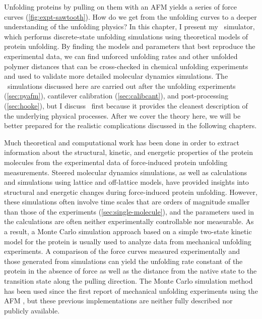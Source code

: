 Unfolding proteins by pulling on them with an AFM yields a series of
force curves (\cref{fig:expt-sawtooth}).  How do we get from the
unfolding curves to a deeper understanding of the unfolding physics?
In this chapter, I present my \sawsim\ simulator, which performs
discrete-state unfolding simulations using theoretical models of
protein unfolding.  By finding the models and parameters that best
reproduce the experimental data, we can find unforced unfolding rates
and other unfolded polymer distances that can be cross-checked in
chemical unfolding experiments and used to validate more detailed
molecular dynamics simulations.  The \sawsim\ simulations discussed
here are carried out after the unfolding experiments
(\cref{sec:pyafm}), cantilever calibration (\cref{sec:calibcant}), and
post-processing (\cref{sec:hooke}), but I discuss \sawsim\ first
because it provides the cleanest description of the underlying
physical processes.  After we cover the theory here, we will be better
prepared for the realistic complications discussed in the following
chapters.

Much theoretical and computational work has been done in order to
extract information about the structural, kinetic, and energetic
properties of the protein molecules from the experimental data of
force-induced protein unfolding measurements.  Steered molecular
dynamics simulations\citep{lu98,lu99}, as well as calculations and
simulations using lattice\citep{klimov99,socci99} and off-lattice
models\citep{klimov00,li01}, have provided insights into structural
and energetic changes during force-induced protein unfolding.
However, these simulations often involve time scales that are orders
of magnitude smaller than those of the experiments
(\cref{sec:single-molecule}), and the parameters used in the
calculations are often neither experimentally controllable nor
measurable.
As a result, a Monte Carlo simulation approach based on a simple
two-state kinetic model for the protein is usually used to analyze
data from mechanical unfolding experiments.  A comparison of the force
curves measured experimentally and those generated from simulations
can yield the unfolding rate constant of the protein in the absence of
force as well as the distance from the native state to the transition
state along the pulling direction.  The Monte Carlo simulation method
has been used since the first report of mechanical unfolding
experiments using the AFM%
\citep{rief97b,rief97a,rief98,carrion-vazquez99b,best02,zinober02,jollymore09},
but these previous implementations are neither fully described nor
publicly available.

